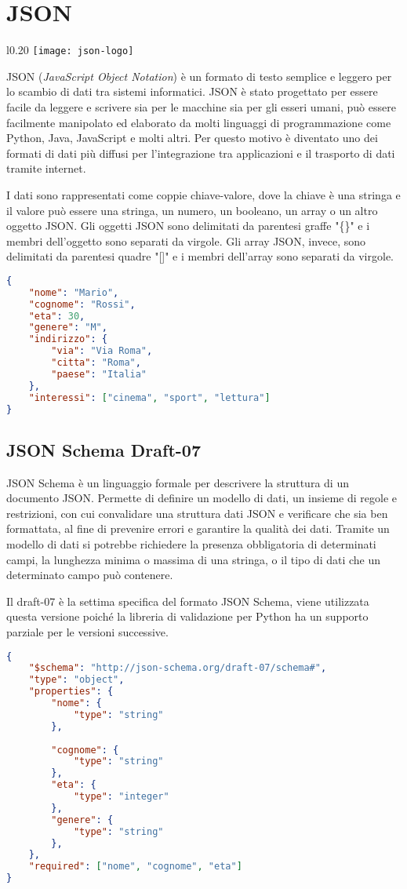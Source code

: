 {\section{JSON}
	
	\begin{wrapfigure}{l}{0.20\textwidth}
		\centering
		\texttt{[image: json-logo]}
	\end{wrapfigure}
	JSON (\textit{JavaScript Object Notation}) è un formato di testo semplice e leggero per lo scambio di dati tra sistemi informatici. JSON è stato progettato per essere facile da leggere e scrivere sia per le macchine sia per gli esseri umani, può essere facilmente manipolato ed elaborato da molti linguaggi di programmazione come Python, Java, JavaScript e molti altri. Per questo motivo è diventato uno dei formati di dati più diffusi per l'integrazione tra applicazioni e il trasporto di dati tramite internet. \par
	I dati sono rappresentati come coppie chiave-valore, dove la chiave è una stringa e il valore può essere una stringa, un numero, un booleano, un array o un altro oggetto JSON. Gli oggetti JSON sono delimitati da parentesi graffe "\{\}" e i membri dell'oggetto sono separati da virgole. Gli array JSON, invece, sono delimitati da parentesi quadre "[]" e i membri dell'array sono separati da virgole.
	
	{\begin{lstlisting}[language=json, caption={Esempio di oggetto JSON}]
{
	"nome": "Mario",
	"cognome": "Rossi",
	"eta": 30,
	"genere": "M",
	"indirizzo": {
		"via": "Via Roma",
		"citta": "Roma",
		"paese": "Italia"
	},
	"interessi": ["cinema", "sport", "lettura"]
}\end{lstlisting}}
	
	\subsection{JSON Schema Draft-07}
	JSON Schema\cite{JSON-Schema} è un linguaggio formale per descrivere la struttura di un documento JSON. Permette di definire un modello di dati, un insieme di regole e restrizioni, con cui convalidare una struttura dati JSON e verificare che sia ben formattata, al fine di prevenire errori e garantire la qualità dei dati. Tramite un modello di dati si potrebbe richiedere la presenza obbligatoria di determinati campi, la lunghezza minima o massima di una stringa, o il tipo di dati che un determinato campo può contenere.\par
	Il draft-07\cite{JSON-Schema-Draft-07} è la settima specifica del formato JSON Schema, viene utilizzata questa versione poiché la libreria di validazione per Python ha un supporto parziale per le versioni successive.
{\begin{lstlisting}[language=json, caption={Esempio di modello di dati JSON-Schema}]
{
	"$schema": "http://json-schema.org/draft-07/schema#",
	"type": "object",
	"properties": {
		"nome": {
			"type": "string"
		},
		
		"cognome": {
			"type": "string"
		},
		"eta": {
			"type": "integer"
		},
		"genere": {
			"type": "string"
		},	
	},
	"required": ["nome", "cognome", "eta"]
}\end{lstlisting}}
}